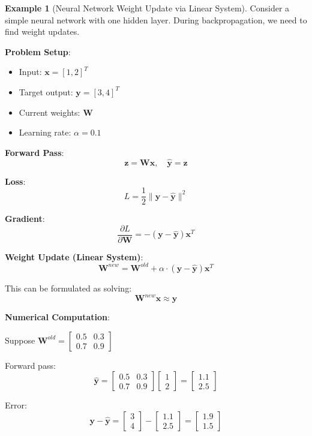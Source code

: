\documentclass[12pt,a4paper]{article}
\theoremstyle{definition}
\newtheorem{example}{Example}[section]
\begin{document}
\begin{example}[Neural Network Weight Update via Linear System]
Consider a simple neural network with one hidden layer. During backpropagation, we need to find weight updates.

\textbf{Problem Setup}:
\begin{itemize}
\item Input: $\mathbf{x} = [1, 2]^T$
\item Target output: $\mathbf{y} = [3, 4]^T$
\item Current weights: $\mathbf{W}$
\item Learning rate: $\alpha = 0.1$
\end{itemize}

\textbf{Forward Pass}:
\[
\mathbf{z} = \mathbf{Wx}, \quad \hat{\mathbf{y}} = \mathbf{z}
\]

\textbf{Loss}:
\[
L = \frac{1}{2}\|\mathbf{y} - \hat{\mathbf{y}}\|^2
\]

\textbf{Gradient}:
\[
\frac{\partial L}{\partial \mathbf{W}} = -(\mathbf{y} - \hat{\mathbf{y}})\mathbf{x}^T
\]

\textbf{Weight Update (Linear System)}:
\[
\mathbf{W}^{new} = \mathbf{W}^{old} + \alpha \cdot (\mathbf{y} - \hat{\mathbf{y}})\mathbf{x}^T
\]

This can be formulated as solving:
\[
\mathbf{W}^{new}\mathbf{x} \approx \mathbf{y}
\]

\textbf{Numerical Computation}:

Suppose $\mathbf{W}^{old} = \begin{bmatrix} 0.5 & 0.3 \\ 0.7 & 0.9 \end{bmatrix}$

Forward pass:
\[
\hat{\mathbf{y}} = \begin{bmatrix} 0.5 & 0.3 \\ 0.7 & 0.9 \end{bmatrix} \begin{bmatrix} 1 \\ 2 \end{bmatrix} = \begin{bmatrix} 1.1 \\ 2.5 \end{bmatrix}
\]

Error:
\[
\mathbf{y} - \hat{\mathbf{y}} = \begin{bmatrix} 3 \\ 4 \end{bmatrix} - \begin{bmatrix} 1.1 \\ 2.5 \end{bmatrix} = \begin{bmatrix} 1.9 \\ 1.5 \end{bmatrix}
\]


\end{example}
\end{document}
